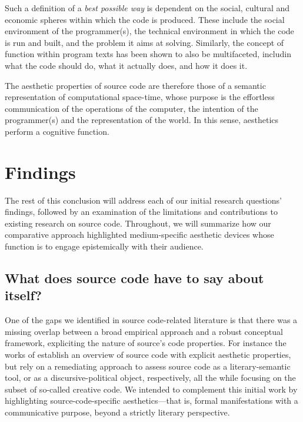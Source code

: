 Such a definition of a \emph{best possible way} is dependent on the social, cultural and economic spheres within which the code is produced. These include the social environment of the programmer(s), the technical environment in which the code is run and built, and the problem it aims at solving. Similarly, the concept of function within program texts has been shown to also be multifaceted, includin what the code should do, what it actually does, and how it does it.

The aesthetic properties of source code are therefore those of a semantic representation of computational space-time, whose purpose is the effortless communication of the operations of the computer, the intention of the programmer(s) and the representation of the world. In this sense, aesthetics perform a cognitive function.

\section{Findings}
\label{sec:findings}

The rest of this conclusion will address each of our initial research questions' findings, followed by an examination of the limitations and contributions to existing research on source code. Throughout, we will summarize how our comparative approach highlighted medium-specific aesthetic devices whose function is to engage epistemically with their audience.

\subsection{What does source code have to say about itself?}
\label{subsec:conclusion-rq-1}

One of the gaps we identified in source code-related literature is that there was a missing overlap between a broad empirical approach and a robust conceptual framework, expliciting the nature of source's code properties. For instance the works of \citep{paloque-berges_poetique_2009,cox_speaking_2013,black_art_2002} establish an overview of source code with explicit aesthetic properties, but rely on a remediating approach to assess source code as a literary-semantic tool, or as a discursive-political object, respectively, all the while focusing on the subset of so-called creative code. We intended to complement this initial work by highlighting source-code-specific aesthetics—that is, formal manifestations with a communicative purpose, beyond a strictly literary perspective.

